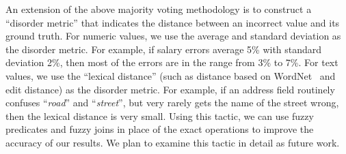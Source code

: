 An extension of the above majority voting methodology is to construct a ``disorder metric'' that indicates the distance between an incorrect value and its ground truth. For numeric values, we use the average and standard deviation as the disorder metric. For example, if salary errors average 5\% with standard deviation 2\%, then most of the errors are in the range from 3\% to 7\%. For text values, we use the ``lexical distance'' (such as distance based on WordNet~\cite{WordNet,DBLP:journals/cacm/Miller95} and edit distance) as the disorder metric. For example, if an address field routinely confuses ``\textit{road}'' and ``\textit{street}'', but very rarely gets the name of the street wrong, then the lexical distance is very small. Using this tactic, we can use fuzzy predicates and fuzzy joins in place of the exact operations to improve the accuracy of our results.
We plan to examine this tactic in detail as future work.




